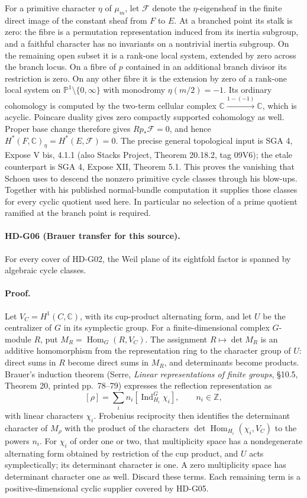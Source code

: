 For a primitive character $\eta$ of $\mu_m$, let $\mathcal F$ denote
the $\eta$-eigensheaf in the finite direct image of the constant sheaf
from $F$ to $E$. At a branched point its stalk is zero: the fibre is a
permutation representation induced from its inertia subgroup, and a
faithful character has no invariants on a nontrivial inertia subgroup.
On the remaining open subset it is a rank-one local system, extended
by zero across the branch locus.
On a fibre of $p$ contained in an additional branch divisor its
restriction is zero. On any other fibre it is the extension by zero
of a rank-one local system on $\mathbb P^1\setminus\{0,\infty\}$ with
monodromy $\eta(m/2)=-1$. Its ordinary cohomology is computed by
the two-term cellular complex $\mathbb C\xrightarrow{1-(-1)}\mathbb C$,
which is acyclic. Poincare duality gives zero compactly supported
cohomology as well.
Proper base change therefore gives $Rp_*\mathcal F=0$, and hence
$H^*(F,\mathbb C)_\eta=H^*(E,\mathcal F)=0$.
The precise general topological input is SGA 4, Expose V bis,
4.1.1 (also Stacks Project, Theorem 20.18.2, tag 09V6);
the etale counterpart is SGA 4, Expose XII, Theorem 5.1.
This proves the vanishing that Schoen uses to descend the nonzero
primitive cycle classes through his blow-ups. Together with his
published normal-bundle computation it supplies those classes for
every cyclic quotient used here. In particular no selection of a
prime quotient ramified at the branch point is required.

\paragraph{HD-G06 (Brauer transfer for this source).}
For every cover of HD-G02, the Weil plane of its eightfold factor is
spanned by algebraic cycle classes.

\paragraph{Proof.}
Let $V_C=H^1(C,\mathbb C)$, with its cup-product alternating form,
and let $U$ be the centralizer of $G$ in its symplectic group.
For a finite-dimensional complex $G$-module $R$, put
$M_R=\operatorname{Hom}_G(R,V_C)$. The assignment
$R\mapsto\det M_R$ is an additive homomorphism from the representation
ring to the character group of $U$: direct sums in $R$ become direct
sums in $M_R$, and determinants become products. Brauer's induction
theorem (Serre, \emph{Linear representations of finite groups},
\S10.5, Theorem 20, printed pp.~78--79) expresses the reflection representation as
\[
[\rho]=\sum_i n_i[\operatorname{Ind}_{H_i}^G\chi_i],\qquad n_i\in\mathbb Z,
\]
with linear characters $\chi_i$. Frobenius reciprocity then identifies
the determinant character of $M_\rho$ with the product of the
characters $\det\operatorname{Hom}_{H_i}(\chi_i,V_C)$ to the powers $n_i$.
For $\chi_i$ of order one or two, that multiplicity space has a
nondegenerate alternating form obtained by restriction of the cup
product, and $U$ acts symplectically; its determinant character is
one. A zero multiplicity space has determinant character one as well.
Discard these terms. Each remaining term is a positive-dimensional
cyclic supplier covered by HD-G05.

